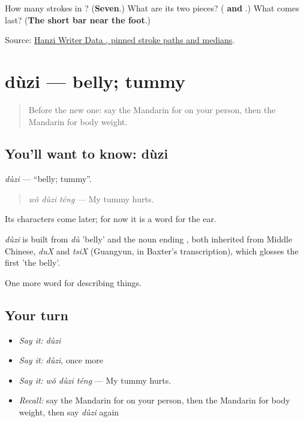 \begin{tcolorbox}[breakable,colback=teal!4,colframe=teal!35!black,title={Before you move on}]
How many strokes in ? (\textbf{Seven}.) What are its two pieces? (\textbf{ and }.) What comes last? (\textbf{The short bar near the foot}.)

Source: \href{https://raw.githubusercontent.com/chanind/hanzi-writer-data/68d10a4b21150cae5e1ebbd223eed289cf32d90c/data/\%E4\%BD\%93.json}{Hanzi Writer Data , pinned stroke paths and medians}.
\end{tcolorbox}
\section[dùzi]{dùzi — belly; tummy}

\label{lesson:ZH-C230-duzi}



\begin{quote}
Before the new one: say the Mandarin for on your person, then the Mandarin for body weight.
\end{quote}

\subsection*{You'll want to know: dùzi}
\emph{dùzi} — \textquotedblleft{}belly; tummy\textquotedblright{}.

\begin{quote}
\emph{wǒ dùzi téng} — My tummy hurts.
\end{quote}

Its characters come later; for now it is a word for the ear.

\begin{cousinweb}
\emph{dùzi} is built from \emph{dù} 'belly' and the noun ending , both inherited from Middle Chinese, \emph{duX} and \emph{tsiX} (Guangyun, in Baxter's transcription), which glosses the first 'the belly'.
\end{cousinweb}

\begin{grammarlens}[title={What you've built}]
One more word for describing things.
\end{grammarlens}

\subsection*{Your turn}
\begin{itemize}
\raggedright
  \item \emph{Say it:} \emph{dùzi}
  \item \emph{Say it:} \emph{dùzi}, once more
  \item \emph{Say it:} \emph{wǒ dùzi téng} — My tummy hurts.
  \item \emph{Recall:} say the Mandarin for on your person, then the Mandarin for body weight, then say \emph{dùzi} again
\end{itemize}

